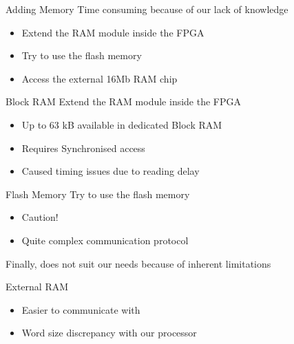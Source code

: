 \documentclass{beamer}
\begin{document}
      \begin{frame}{Adding Memory}
          Time consuming because of our lack of knowledge
          \begin{itemize}
            \item Extend the RAM module inside the FPGA
            \item Try to use the flash memory
            \item Access the external 16Mb RAM chip
        \end{itemize}
      \end{frame}

      \begin{frame}{Block RAM}
        Extend the RAM module inside the FPGA
          \begin{itemize}
            \item Up to 63 kB available in dedicated Block RAM
            \item Requires Synchronised access
            \item Caused timing issues due to reading delay
           \end{itemize}
      \end{frame}

      \begin{frame}{Flash Memory}
        Try to use the flash memory
        \begin{itemize}
          \item Caution!
          \item Quite complex communication protocol
        \end{itemize}
        \pause
        Finally, does not suit our needs because of inherent limitations
      \end{frame}

      \begin{frame}{External RAM}
        \begin{itemize}
          \item Easier to communicate with
          \item Word size discrepancy with our processor
        \end{itemize}
      \end{frame}
\end{document}
